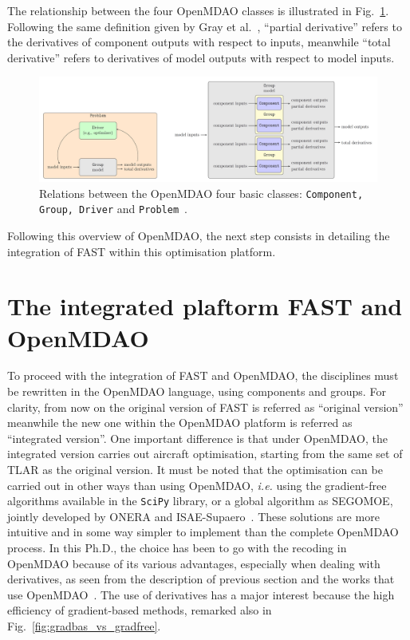 The relationship between the four OpenMDAO classes is illustrated in Fig.~\ref{fig:omdao_class_relation}. Following the same definition given by Gray et al.~\cite{bib:gray_omdao}, ``partial derivative'' refers to the derivatives of component outputs with respect to inputs, meanwhile ``total derivative'' refers to derivatives of model outputs with respect to model inputs. 
\begin{figure}[!h]
	\centering
	\includegraphics[keepaspectratio, width=\textwidth]{images/chap2/omdao_comp_relation.jpg}
	\caption{Relations between the OpenMDAO four basic classes: \texttt{Component, Group, Driver} and \texttt{Problem}~\cite{bib:gray_omdao}.}
	\label{fig:omdao_class_relation}
\end{figure}

Following this overview of OpenMDAO, the next step consists in detailing the integration of FAST within this optimisation platform. 

\section{The integrated plaftorm FAST and OpenMDAO}
\label{sec:chap2_fast_omdao_base}

To proceed with the integration of FAST and OpenMDAO, the disciplines must be rewritten in the OpenMDAO language, using components and groups.
For clarity, from now on the original version of FAST is referred as ``original version'' meanwhile the new one within the OpenMDAO platform is referred as ``integrated version''. 
One important difference is that under OpenMDAO, the integrated version carries out aircraft optimisation, starting from the same set of TLAR as the original version.
It must be noted that the optimisation can be carried out in other ways than using OpenMDAO, \textit{i.e.} using the gradient-free algorithms available in the \texttt{SciPy} library, or a global algorithm as SEGOMOE, jointly developed by ONERA and ISAE-Supaero~\cite{bib:bartoli_sego}.
These solutions are more intuitive and in some way simpler to implement than the complete OpenMDAO process. 
In this Ph.D., the choice has been to go with the recoding in OpenMDAO because of its various advantages, especially when dealing with derivatives, as seen from the description of previous section and the works that use OpenMDAO~\cite{bib:gray_omdao}. 
The use of derivatives has a major interest because the high efficiency of gradient-based methods, remarked also in Fig.~\ref{fig:gradbas_vs_gradfree}. 

